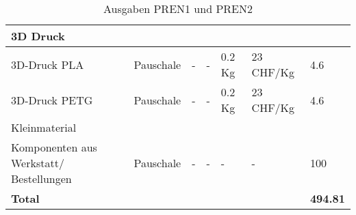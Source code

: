 \documentclass[main.tex]{subfiles} %
\begin{document}
\begin{table}[htbp]
{\begin{tabular}{|p{3cm}|p{2.5cm}|p{2.5cm}|p{3cm}|p{1cm}|p{1.5cm}|p{1cm}|}
            \rowcolor{lightgray} 3D Druck           &                    &                              &                         &                 &                           &                            \\ \hline
            3D-Druck PLA                            & Pauschale          & -                            & -                       & 0.2 Kg          & 23 CHF/Kg                 & 4.6                         \\ \hline
            3D-Druck PETG                           & Pauschale          & -                            & -                       & 0.2 Kg          & 23 CHF/Kg                 & 4.6                         \\ \hline
            \rowcolor{lightgray} Kleinmaterial      &                    &                              &                         &                 &                           &                             \\ \hline
            Komponenten aus Werkstatt/ Bestellungen & Pauschale          & -                            & -                       & -               & -                         & 100                          \\ \hline
            \textbf{Total}                          &                    &                              &                         &                 &                           & \textbf{494.81}              \\ \hline
        \end{tabular}
    }
    \caption{Ausgaben PREN1 und PREN2}
    \label{tab:Ausgaben_PREN}
\end{table}
\end{document}
